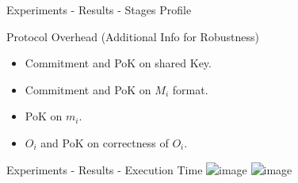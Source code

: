 \begin{frame}{Experiments - Results - Stages Profile}
\end{frame}

\begin{frame}{Protocol Overhead (Additional Info for Robustness)}
    \begin{itemize}
        \item Commitment and PoK on shared Key.
        \item Commitment and PoK on $M_i$ format.
        \item PoK on $m_i$.
        \item $O_i$ and PoK on correctness of $O_i$.
    \end{itemize}
    
\end{frame}

\begin{frame}{Experiments - Results - Execution Time}
    \centering
    \includegraphics<1-1>[scale=0.3]{images/fixed_room.png}
    \includegraphics<2>[scale=0.3]{images/variable_room.png}
\end{frame}